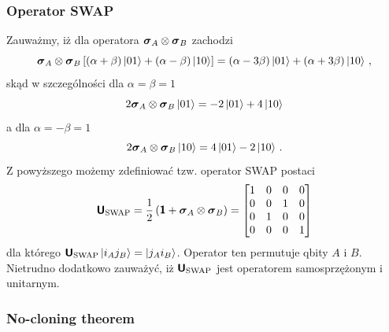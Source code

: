 \documentclass{myclass}
\begin{document}
\subsubsection*{Operator SWAP}

Zauważmy, iż dla operatora \(\boldsymbol{\mathsf{\sigma}}_A \otimes \boldsymbol{\mathsf{\sigma}}_B\) zachodzi
\begin{equation*}
    \boldsymbol{\mathsf{\sigma}}_A \otimes \boldsymbol{\mathsf{\sigma}}_B\left[(\alpha + \beta)\ket{01} + (\alpha - \beta)\ket{10}\right] = (\alpha - 3\beta)\ket{01} + (\alpha + 3\beta)\ket{10}\,,
\end{equation*}
skąd w szczególności dla \(\alpha = \beta = 1\)
\begin{equation*}
   2 \boldsymbol{\mathsf{\sigma}}_A \otimes \boldsymbol{\mathsf{\sigma}}_B \ket{01} = -2 \ket{01} + 4 \ket{10}
\end{equation*}
a dla \(\alpha = -\beta = 1\)
\begin{equation*}
    2 \boldsymbol{\mathsf{\sigma}}_A \otimes \boldsymbol{\mathsf{\sigma}}_B \ket{10} = 4 \ket{01} - 2 \ket{10}\,.
\end{equation*}
Z powyższego możemy zdefiniować tzw. operator SWAP postaci
\begin{equation*}
    \oper{U}_\text{SWAP} = \frac{1}{2}\left(\oper{1} + \oper{\sigma}_A \otimes \oper{\sigma}_B \right) = \mqty[1 & 0 & 0 & 0\\ 0 & 0 & 1 & 0 \\ 0 & 1 & 0 & 0 \\ 0 & 0 & 0 & 1]
\end{equation*}
dla którego \(\boldsymbol{\mathsf{U}}_\text{SWAP}\ket{i_Aj_B} = \ket{j_Ai_B}\). Operator ten permutuje qbity \(A\)
i \(B\). Nietrudno dodatkowo zauważyć, iż \(\boldsymbol{\mathsf{U}}_\text{SWAP}\) jest operatorem samosprzężonym i
unitarnym.

\subsubsection{No-cloning theorem}
\end{document}
